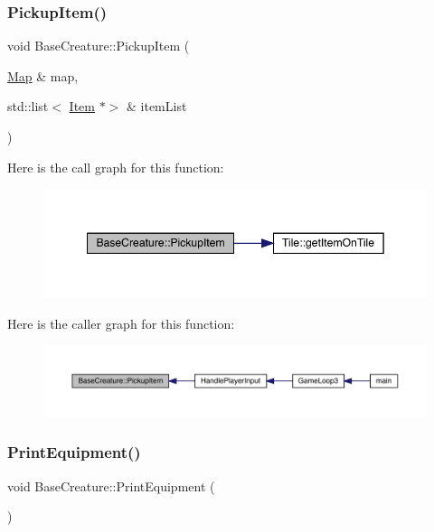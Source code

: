 \subsubsection{\texorpdfstring{Pickup\+Item()}{PickupItem()}}
{\footnotesize\ttfamily void Base\+Creature\+::\+Pickup\+Item (\begin{DoxyParamCaption}\item[{\mbox{\hyperlink{class_map}{Map}} \&}]{map,  }\item[{std\+::list$<$ \mbox{\hyperlink{class_item}{Item}} $\ast$$>$ \&}]{item\+List }\end{DoxyParamCaption})}

Here is the call graph for this function\+:
\nopagebreak
\begin{figure}[H]
\begin{center}
\leavevmode
\includegraphics[width=348pt]{class_base_creature_a2d45724079ff2eeb6606b222e405e4a8_cgraph}
\end{center}
\end{figure}
Here is the caller graph for this function\+:
\nopagebreak
\begin{figure}[H]
\begin{center}
\leavevmode
\includegraphics[width=350pt]{class_base_creature_a2d45724079ff2eeb6606b222e405e4a8_icgraph}
\end{center}
\end{figure}
\mbox{\label{class_base_creature_ac3d7907a8d8e0967a5881ff180205028}} 
\subsubsection{\texorpdfstring{Print\+Equipment()}{PrintEquipment()}}
{\footnotesize\ttfamily void Base\+Creature\+::\+Print\+Equipment (\begin{DoxyParamCaption}{ }\end{DoxyParamCaption})}

